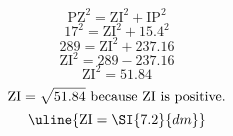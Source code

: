 \[\text{PZ}^{2}=\text{ZI}^{2}+\text{IP}^{2}\]
\[17^{2}=\text{ZI}^{2}+15.4^{2}\]
\[289=\text{ZI}^{2}+237.16\]
\[\text{ZI}^{2}=289-237.16\]
\[\text{ZI}^{2}=51.84\]
\[\text{ZI}=\sqrt{\mathstrut 51.84}\text{ because ZI is positive.}\]
\[\uline{\text{ZI}=\SI{7.2}{dm}}\]